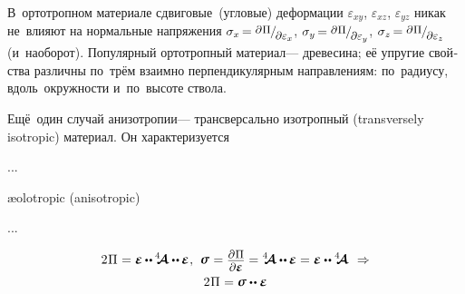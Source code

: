 \begin{otherlanguage}{russian}
В~ортотропном материале сдвиговые~(угловые) деформации $\varepsilon_{xy}$, $\varepsilon_{xz}$, $\varepsilon_{yz}$ никак не~влияют на нормальные напряжения ${\sigma_x \hspace{-0.25ex} = \raisemath{.16em}{\scalebox{0.88}{$\partial \hspace{.1ex} \potential$}} \hspace{-0.1ex} / \hspace{-0.2ex} \raisemath{-0.32em}{\scalebox{0.88}{$\partial \varepsilon_x$}}}$, ${\sigma_y \hspace{-0.25ex} = \raisemath{.16em}{\scalebox{0.88}{$\partial \hspace{.1ex} \potential$}} \hspace{-0.1ex} / \hspace{-0.2ex} \raisemath{-0.32em}{\scalebox{0.88}{$\partial \varepsilon_y$}}}$, ${\sigma_z \hspace{-0.25ex} = \raisemath{.16em}{\scalebox{0.88}{$\partial \hspace{.1ex} \potential$}} \hspace{-0.1ex} / \hspace{-0.2ex} \raisemath{-0.32em}{\scalebox{0.88}{$\partial \varepsilon_z$}}}$ (и~наоборот).
Популярный ортотропный материал\:--- древесина; её упругие свойства различны по~трём взаимно перпендикулярным направлениям: по~радиусу, вдоль~окружности и~по~высоте ствола.

Ещё~один случай анизотропии\:--- трансверсально изотропный (transversely isotropic) материал.
Он характеризуется

...

æolotropic (anisotropic)

...

\begin{equation}\label{potentialenergydensityfromstressandstrain}
\begin{gathered}[b]
2 \hspace{.1ex} \potential \hspace{.1ex}
= \infinitesimaldeformation \hspace{-0.1ex} \dotdotp \hspace{-0.1ex} \stiffnesstensor \dotdotp \hspace{-0.1ex} \infinitesimaldeformation
\hspace{.1ex} ,
\hspace{.4em}
\linearstress \hspace{.1ex} = \scalebox{0.9}{$\displaystyle\frac{\raisemath{-0.2em}{\partial\hspace{.1ex} \potential}}{\raisemath{.04em}{\partial \infinitesimaldeformation}}$} = \stiffnesstensor \dotdotp \hspace{-0.1ex} \infinitesimaldeformation = \infinitesimaldeformation \dotdotp \stiffnesstensor
\hspace{.4em}\Rightarrow
\\[-0.1em]
%
2 \hspace{.1ex} \potential \hspace{.1ex} = \linearstress \dotdotp \infinitesimaldeformation
\end{gathered}
\end{equation}


\end{otherlanguage}
